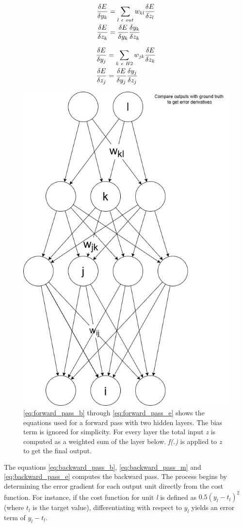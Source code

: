 \begin{align}
    \label{eq:backward_pass_m}
    \frac{\delta E}{\delta y_k} &= \sum_{l\ \epsilon\ out} w_{kl} \frac{\delta E}{\delta z_l} \\
    \frac{\delta E}{\delta z_k} &= \frac{\delta E}{\delta y_k} \frac{\delta y_k}{\delta z_k} \notag
\end{align}

\begin{align}
    \label{eq:backward_pass_e}
    \frac{\delta E}{\delta y_j} &= \sum_{k\ \epsilon\ H2} w_{jk} \frac{\delta E}{\delta z_k} \\
    \frac{\delta E}{\delta z_j} &= \frac{\delta E}{\delta y_j} \frac{\delta y_j}{\delta z_j} \notag
\end{align}

\begin{figure}
    \centering
    \includegraphics[width=0.5\linewidth]{figures/neural_net_back_prop.jpg}
    \caption{\autoref{eq:forward_pass_b} through \autoref{eq:forward_pass_e} shows the equations used for a forward pass with two hidden layers. The bias term is ignored for simplicity. For every layer the total input \textit{z} is computed as a weighted sum of the layer below. \textit{f(.)} is applied to \textit{z} to get the final output.}
    \label{fig:multilayer_neural_net}
\end{figure}


The equations \autoref{eq:backward_pass_b}, \autoref{eq:backward_pass_m} and \autoref{eq:backward_pass_e} computes the backward pass. The process begins by determining the error gradient for each output unit directly from the cost function. For instance, if the cost function for unit \textit{l} is defined as \(0.5(y_l-t_l)^2\) (where \(t_l\) is the target value), differentiating with respect to \(y_l\) yields an error term of \(y_l-t_l\).

